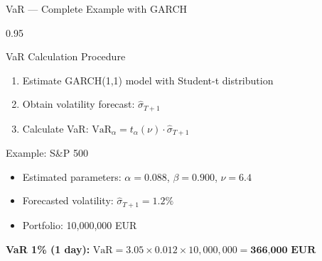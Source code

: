 \documentclass[9pt, aspectratio=169, t]{beamer}
\begin{document}
\begin{frame}{VaR --- Complete Example with GARCH}
    \begin{cminipage}{0.95\textwidth}
    \begin{block}{VaR Calculation Procedure}
        \begin{enumerate}\setlength{\itemsep}{0pt}
            \item Estimate GARCH(1,1) model with Student-t distribution
            \item Obtain volatility forecast: $\hat{\sigma}_{T+1}$
            \item Calculate VaR: $\text{VaR}_\alpha = t_\alpha(\nu) \cdot \hat{\sigma}_{T+1}$
        \end{enumerate}
    \end{block}

    \vspace{0.2cm}

    \begin{exampleblock}{Example: S\&P 500}
        \begin{itemize}\setlength{\itemsep}{0pt}
            \item Estimated parameters: $\alpha = 0.088$, $\beta = 0.900$, $\nu = 6.4$
            \item Forecasted volatility: $\hat{\sigma}_{T+1} = 1.2\%$
            \item Portfolio: 10,000,000 EUR
        \end{itemize}

        \vspace{0.2cm}

        \textbf{VaR 1\% (1 day):}
        $\text{VaR} = 3.05 \times 0.012 \times 10{,}000{,}000 = \textbf{366{,}000 EUR}$
    \end{exampleblock}
    \end{cminipage}
\end{frame}
\end{document}
